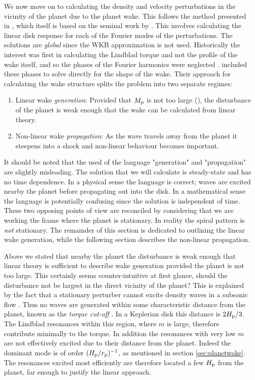We now move on to calculating the density and velocity perturbations in the vicinity of the planet due to the planet wake.
This follows the method presented in \citet{goodman2001,rafikov2002a}, which itself is based on the seminal work by \citet{goldreich1978,goldreich1980}.
This involves calculating the linear disk response for each of the Fourier modes of the perturbations.
The solutions are \textit{global} since the WKB approximation is not used.
Historically the interest was first in calculating the Lindblad torque and not the profile of the wake itself, and so the phases of the Fourier harmonics were neglected \citep{goldreich1978,goldreich1980,artymowicz1993a,ward1997}.
\citet{goodman2001} included these phases to solve directly for the shape of the wake.
Their approach for calculating the wake structure splits the problem into two separate regimes: 
\begin{enumerate}
    \item Linear wake \textit{generation}: Provided that $M_{\rm p}$ is not too large (), the disturbance of the planet is weak enough that the wake can be calculated from linear theory.
    \item Non-linear wake \textit{propagation}: As the wave travels away from the planet it steepens into a shock and non-linear behaviour becomes important.  
\end{enumerate}
It should be noted that the used of the language "generation" and "propagation" are slightly misleading.
The solution that we will calculate is steady-state and has no time dependence.
In a physical sense the language is correct; waves are excited nearby the planet before propagating out into the disk.
In a mathematical sense the language is potentially confusing since the solution is independent of time.
These two opposing points of view are reconciled by considering that we are working the frame where the planet is stationary. 
In reality the spiral pattern is \textit{not} stationary.
The remainder of this section is dedicated to outlining the linear wake generation, while the following section describes the non-linear propagation.

Above we stated that nearby the planet the disturbance is weak enough that linear theory is sufficient to describe wake generation provided the planet is not too large.
This certainly seems counter-intuitive at first glance, should the disturbance not be largest in the direct vicinity of the planet?
This is explained by the fact that a stationary perturber cannot excite density waves in a subsonic flow \citep{landau1987}.
Thus no waves are generated within some characteristic distance from the planet, known as the \textit{torque cut-off} \citep{goldreich1980}.
In a Keplerian disk this distance is $2H_{\rm p}/3$.
The Lindblad resonances within this region, where $m$ is large, therefore contribute minimally to the torque.
In addition the resonances with very low $m$ are not effectively excited due to their distance from the planet.
Indeed the dominant mode is of order $(H_{\rm p} / r_{\rm p})^{-1}$, as mentioned in section \ref{sec:planetwake}.
The resonances excited most efficiently are therefore located a few $H_{\rm p}$ from the planet, far enough to justify the linear approach.

